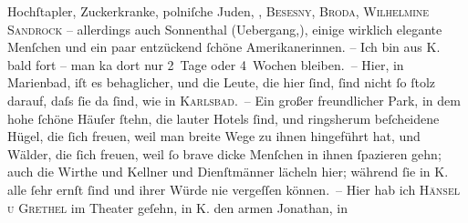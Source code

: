 \begin{ledgroupsized}[t]{13cm}
                    Hochſtapler, Zuckerkranke, polniſche Juden, \label{K_L00462_1v}\label{K_L00462_1h}, \textsc{Besesny}, \textsc{Broda}, \textsc{Wilhelmine Sandrock} – allerdings auch Sonnenthal
                    (Uebergang,), einige wirklich elegante Menſchen und ein paar entzückend ſchöne
                    Amerikanerinnen. – Ich bin aus \textsc{K}. {\pb}bald fort – man ka{\geminationn} dort nur 2 Tage oder 4 Wochen bleiben. – Hier,
                    in Marienbad, iſt es behaglicher, und die
                    Leute, die hier ſind, ſind nicht ſo ſtolz darauf, daſs ſie da ſind, wie in
                        \textsc{Karlsbad}. – Ein großer freundlicher Park, in dem hohe ſchöne Häuſer ſtehn,
                    die lauter Hotels ſind, und ringsherum beſcheidene Hügel, die ſich freuen, weil
                    man breite Wege zu ihnen hingeführt hat, und Wälder, die ſich freuen, weil ſo
                    brave dicke Menſchen in ihnen ſpazieren gehn; auch die Wirthe und Kellner {\pb}und Dienſtmänner lächeln hier; während ſie in
                        \textsc{K.} alle ſehr ernſt ſind und ihrer Würde nie vergeſſen können. – Hier
                    hab ich \textsc{Hänsel u
                        Grethel} im Theater geſehn, in \textsc{K.} den armen Jonathan, in

\end{ledgroupsized}
